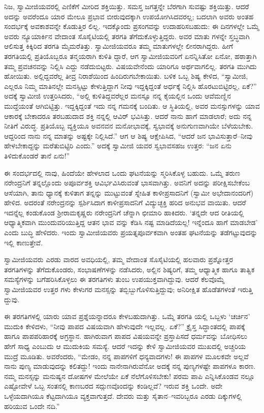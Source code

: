 ನಿಜ, ಸ್ವಾಮೀಜಿಯವರಲ್ಲಿ ಎಣಿಕೆಗೆ ಮೀರಿದ ಶಕ್ತಿಯಿತ್ತು. ಸಮಸ್ತ ಜಗತ್ತನ್ನೇ ಬೆರಗಾಗಿ ಸುವಷ್ಟು ಶಕ್ತಿಯಿತ್ತು. ಆದರೆ ಅದನ್ನು ಅವರೆಂದೂ ಯಾರ ಮೇಲೂ ಪ್ರಭಾವ ಬೀರುವುದಕ್ಕಾಗಿ ಉಪಯೋಗಿಸಿದವರಲ್ಲ; ಬದಲಾಗಿ ಅವರು ಅಂತಹ ಸಂದರ್ಭಕ್ಕೆ ಅವಕಾಶವನ್ನೇ ಕೊಡುತ್ತಿರ ಲಿಲ್ಲ. ಇದಕ್ಕೊಂದು ಪ್ರಸಂಗವನ್ನು ಉದಾಹರಿಸಬಹುದು: ಈ ದಿನಗಳಲ್ಲೇ ಒಮ್ಮೆ ಅವರು ನ್ಯೂಯಾರ್ಕಿನ ವೇದಾಂತ ಸೊಸೈಟಿಯಲ್ಲಿ ತರಗತಿ ತೆಗೆದುಕೊಳ್ಳುತ್ತಿದ್ದರು. ಅವರ ಮಾತು ಗಳನ್ನೇ ಸ್ತಬ್ಧವಾಗಿ ಆಲಿಸುತ್ತ ಕಿಕ್ಕಿರಿದ ತರಗತಿ ಮೈಮರೆತಿತ್ತು. ಸ್ವಾಮೀಜಿಯವರೂ ತಮ್ಮ ಮಾತುಗಳಲ್ಲೇ ಲೀನರಾಗಿದ್ದರು. ಹೀಗೆ ತರಗತಿಯಲ್ಲಿ ಪ್ರತಿಯೊಬ್ಬರೂ ತನ್ಮಯರಾಗಿ ಕುಳಿತಿ ದ್ದಾರೆ, ಆಗ ಸ್ವಾಮೀಜಿಯವರಿಗೆ ಏನನ್ನಿಸಿತೋ ಏನೋ, ಹಠಾತ್ತಾಗಿ ತಮ್ಮ ಪ್ರವಚನವನ್ನು ನಿಲ್ಲಿಸಿ ಎದ್ದು ನಡೆದುಬಿಟ್ಟರು. ವಿಷಯವೇನೆಂದು ಯಾರಿಗೂ ಅರ್ಥವಾಗಲಿಲ್ಲ. ತರಗತಿ ಮುಗಿದು ಹೋಯಿತು. ಅಲ್ಲಿದ್ದವರೆಲ್ಲ ತೀವ್ರ ನಿರಾಶೆಯಿಂದ ಹಿಂದಿರುಗಬೇಕಾಯಿತು. ಬಳಿಕ ಒಬ್ಬ ಶಿಷ್ಯ ಕೇಳಿದ, “ಸ್ವಾಮೀಜಿ, ಎಲ್ಲರೂ ನಿಮ್ಮ ಮಾತಿನಲ್ಲೇ ಮನಸ್ಸಿಟ್ಟು ಕೇಳುತ್ತಿದ್ದಾಗ ನೀವು ಇದ್ದಕ್ಕಿದ್ದಂತೆ ಅರ್ಧಕ್ಕೆ ನಿಲ್ಲಿಸಿ ಹೊರಟುಬಿಟ್ಟಿರಲ್ಲ, ಏಕೆ?” ಅದಕ್ಕೆ ಸ್ವಾಮೀಜಿ ಉತ್ತರಿಸಿದರು, “ಅಲ್ಲಿ ಕುಳಿತಿದ್ದವರೆಲ್ಲರ ಮನಸ್ಸೂ ನನ್ನ ಕೈಯಲ್ಲಿನ ಒಂದು ಆವೆಮಣ್ಣಿನ ಮುದ್ದೆಯಂತೆ ಆಗಿಬಿಟ್ಟಿತ್ತು. ಇದ್ದಕ್ಕಿದ್ದಂತೆ ಇದು ನನ್ನ ಗಮನಕ್ಕೆ ಬಂದಿತು. ಆ ಸ್ಥಿತಿಯಲ್ಲಿ, ಅವರ ಮನಸ್ಸುಗಳನ್ನು ಯಾವ ಆಕಾರಕ್ಕೆ ಬೇಕಾದರೂ ತರಬಹುದಾದ ಶಕ್ತಿ ನನ್ನಲ್ಲಿ ಆವಿರ್ ಭವಿಸಿತ್ತು. ಆದರೆ ನಾನು ಹಾಗೆ ಮಾಡಲಾರೆ; ಅದು ನನ್ನ ನೀತಿಗೆ ವಿರುದ್ಧ. ಪ್ರತಿಯೊಬ್ಬ ವ್ಯಕ್ತಿಯೂ ಅವನವನ ಮನೋಭಾವಕ್ಕೆ, ಸ್ವಭಾವಕ್ಕೆ ಅನುಗುಣವಾಗಿಯೇ ಬೆಳೆಯಬೇಕು. ಆದ್ದರಿಂದ ನಾನು ನನ್ನ ಮಾತನ್ನು ಅಷ್ಟಕ್ಕೇ ನಿಲ್ಲಿಸಿದೆ.” ಆಗ ಆ ಶಿಷ್ಯ ಆಕ್ಷೇಪಿಸಿದ, “ಆದರೆ ಜನ ಭಾವಿಸುತ್ತಾರೆ–ನೀವು ಹೇಳಬೇಕಾದ್ದನ್ನು ಮರೆತುಬಿಟ್ಟಿರಿ ಎಂದು.” ಅದಕ್ಕೆ ಸ್ವಾಮೀಜಿ ಯವರ ಸ್ವಭಾವಸಹಜ ಉತ್ತರ: “ಜನ ಏನು ತಿಳಿದುಕೊಂಡರೆ ತಾನೆ ಏನು!”

ಈ ಸಂದರ್ಭದಲ್ಲಿ ನಾವು, ಹಿಂದೆಯೇ ಹೇಳಲಾದ ಒಂದು ಘಟನೆಯನ್ನು ಸ್ಮರಿಸಿಕೊಳ್ಳ ಬಹುದು. ಒಮ್ಮೆ ತರುಣ ನರೇಂದ್ರನಿಗೆ ತನ್ನಲ್ಲೊಂದು ಅಪೂರ್ವಶಕ್ತಿ ಆವಿರ್ಭವಿಸಿರುವಂತೆ ಭಾಸವಾಗಿತ್ತು. ಅವನಿಗೆ ಅದನ್ನು ಪರೀಕ್ಷಿಸಬೇಕೆಂಬ ಆಸೆಯಾಗಿ, ತಾನು ಧ್ಯಾನಕ್ಕೆ ಕುಳಿತಾಗ ತನ್ನನ್ನು ಮುಟ್ಟುವಂತೆ ಸ್ನೇಹಿತ ಕಾಳೀಪ್ರಸಾದನಿಗೆ (ಸ್ವಾಮೀ ಅಭೇದಾನಂದರಿಗೆ) ಹೇಳಿದ. ಅದರಂತೆ ನರೇಂದ್ರನನ್ನು ಸ್ಪರ್ಶಿಸಿದಾಗ ಕಾಳೀಪ್ರಸಾದನಿಗೆ ವಿದ್ಯುಚ್ಛಕ್ತಿ ಹರಿದ ಅನುಭವ ವಾಯಿತು. ಆದರೆ ಇದನ್ನೆಲ್ಲ ಕಂಡುಕೊಂಡ ಶ್ರೀರಾಮಕೃಷ್ಣರು ನರೇಂದ್ರನಿಗೆ ಚೆನ್ನಾಗಿ ಛೀಮಾರಿ ಹಾಕಿದರು. ‘ತನ್ನದೇ ಆದ ರೀತಿಯಲ್ಲಿ ಆಧ್ಯಾತ್ಮಿಕವಾಗಿ ಮುಂದುವರಿಯುತ್ತಿದ್ದ ಆತನ ಭಾವ ವನ್ನು ಕೆಡಿಸಿ ನಷ್ಟ ಮಾಡಿದೆಯಲ್ಲ! ಇನ್ನೆಂದೂ ಹಾಗೆ ಮಾಡಬೇಡ’ ಎಂದು ಬುದ್ಧಿ ಹೇಳಿದರು. ಇಂದು ಸ್ವಾಮೀಜಿಯವರು ಪ್ರಯತ್ನಪೂರ್ವಕವಾಗಿ ಅಂತಹ ಘಟನೆಯನ್ನು ತಡೆಗಟ್ಟುವುದನ್ನು ಇಲ್ಲಿ ಕಾಣುತ್ತೇವೆ.

ಸ್ವಾಮೀಜಿಯವರು ಎರಡು ವಾರದ ಅವಧಿಯಲ್ಲಿ, ತಮ್ಮ ವೇದಾಂತ ಸೊಸೈಟಿಯಲ್ಲಿ ಹಲವಾರು ಪ್ರಶ್ನೋತ್ತರ ತರಗತಿಗಳನ್ನು ತೆಗೆದುಕೊಂಡರು, ಸಂಭಾಷಣೆಗಳನ್ನು ನಡೆಸಿದರು, ಅಲ್ಲಿನ ಶಿಷ್ಯರಿಗೆ, ತಮ್ಮ ಆಧ್ಯಾತ್ಮಿಕ ಹಾಗೂ ತಾತ್ವಿಕ ಸಮಸ್ಯೆಗಳನ್ನು ಬಗೆಹರಿಸಿಕೊಳ್ಳಲು ಈ ತರಗತಿಗಳು ತುಂಬ ಉಪಯುಕ್ತವಾಗಿದ್ದುವು. ಆದರೆ ಕೆಲವೊಮ್ಮೆ ಸ್ವಾಮೀಜಿಯವರ ಉತ್ತರ ಗಳು ಕೇಳುಗರ ಮನಸ್ಸನ್ನು ತಬ್ಬಿಬ್ಬುಗೊಳಿಸುತ್ತಿದ್ದುವು; ಅನಿರೀಕ್ಷಿತ ಹೊಡೆತಗಳಂತೆ ಇರುತ್ತಿ ದ್ದುವು.

ಈ ತರಗತಿಗಳಲ್ಲಿ ಯಾರು ಯಾವ ಪ್ರಶ್ನೆಯನ್ನಾದರೂ ಕೇಳಬಹುದಾಗಿತ್ತು. ಒಮ್ಮೆ ತರಗತಿ ಯಲ್ಲಿ ಒಬ್ಬಳು ‘ಚರ್ಚಿನ’ ಮುದುಕಿ ಕೇಳಿದಳು, “ನೀವು ಪಾಪದ ವಿಷಯವಾಗಿ ಹೇಳುವುದೇ ಇಲ್ಲವಲ್ಲ. ಏಕೆ?” ಕ್ರೈಸ್ತ ಸಿದ್ಧಾಂತದಲ್ಲಿ ಪಾಪಕ್ಕೆ ಹಾಗೂ ಪಾಪಪರಿಹಾರಕ್ಕೆ ಅಗ್ರಸ್ಥಾನ. ಹಾಗಿರುವಾಗ ಪಾಪದ ವಿಷಯವನ್ನೇ ಪ್ರಸ್ತಾಪಿಸದೆ ಧರ್ಮವನ್ನು ಬೋಧಿಸಲು ಹೇಗೆ ಸಾಧ್ಯ ಎಂಬುದು ಆ ಮುದುಕಿಯ ಸಮಸ್ಯೆ. ಆದರೆ ಇದನ್ನು ಕೇಳಿ ಸ್ವಾಮೀಜಿಯವರ ಮುಖದಲ್ಲಿ ಅಚ್ಚರಿಯ ಮುದ್ರೆ ಮೂಡಿತು. ಅವರೆಂದರು, “ಮೇಡಂ, ನನ್ನ ಪಾಪಗಳಿಗೆ ಧನ್ಯವಾದಗಳು! ಈ ಪಾಪಗಳ ಮೂಲಕವೇ ಅಲ್ಲವೆ ನಾನು ಪುಣ್ಯ ಮಾಡುವುದನ್ನು ಕಲಿತದ್ದು! ಇಂದು ನಾನೇನಾಗಿರುವೆನೋ ಅದಕ್ಕೆ ನನ್ನ ಪುಣ್ಯಗಳಷ್ಟೇ ಪಾಪಗಳೂ ಕಾರಣ. ನಮ್ಮ ಮನಸ್ಸನ್ನು ಮನುಷ್ಯನ ದೋಷಗಳ ಮೇಲೆಯೇ ಏಕೆ ನೆಲೆಗೊಳಿಸಬೇಕು! ಪರಮ ಪಾಪಿ ಎನ್ನಿಸಿಕೊಂಡವ ನಲ್ಲೂ ಎಷ್ಟೋವೇಳೆ ಒಬ್ಬ ಸಂತನಲ್ಲಿ ಕಾಣಬರದ ಸದ್ಗುಣವೊಂದನ್ನು ಕಂಡಿಲ್ಲವೆ? ಇರುವ ಶಕ್ತಿ ಒಂದೇ. ಅದೇ ಒಳ್ಳೆಯದಾಗಿಯೂ ಕೆಟ್ಟದಾಗಿಯೂ ವ್ಯಕ್ತವಾಗುತ್ತದೆ. ದೇವರು ಮತ್ತು ಸೈತಾನ–ಇವರಿಬ್ಬರೂ ಎರಡು ದಿಕ್ಕುಗಳಲ್ಲಿ ಹರಿಯುವ ಒಂದೇ ನದಿ.”

